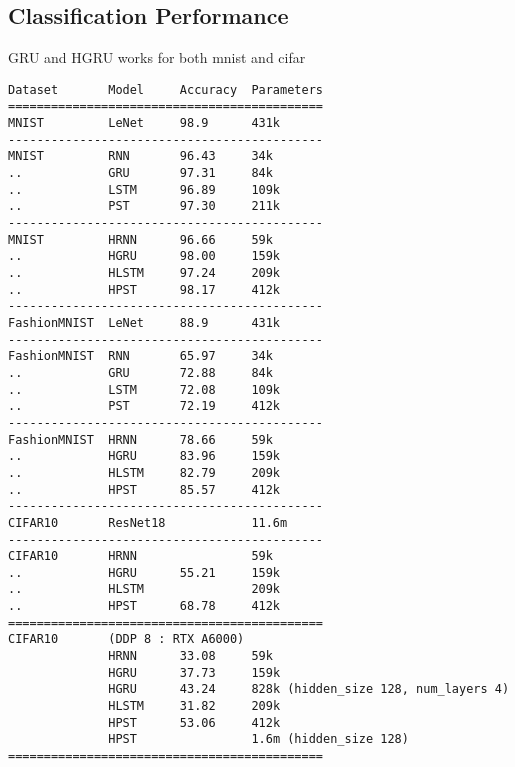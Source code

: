 \documentclass[10pt,twocolumn,letterpaper]{article}
\begin{document}
\subsection{Classification Performance}

GRU and HGRU works for both mnist and cifar

\begin{verbatim}
Dataset       Model     Accuracy  Parameters
============================================
MNIST         LeNet     98.9      431k
--------------------------------------------
MNIST         RNN       96.43     34k
..            GRU       97.31     84k
..            LSTM      96.89     109k
..            PST       97.30     211k
--------------------------------------------
MNIST         HRNN      96.66     59k
..            HGRU      98.00     159k
..            HLSTM     97.24     209k
..            HPST      98.17     412k
--------------------------------------------
FashionMNIST  LeNet     88.9      431k
--------------------------------------------
FashionMNIST  RNN       65.97     34k
..            GRU       72.88     84k
..            LSTM      72.08     109k
..            PST       72.19     412k
--------------------------------------------
FashionMNIST  HRNN      78.66     59k
..            HGRU      83.96     159k
..            HLSTM     82.79     209k
..            HPST      85.57     412k
--------------------------------------------
CIFAR10       ResNet18            11.6m
--------------------------------------------
CIFAR10       HRNN                59k
..            HGRU      55.21     159k
..            HLSTM               209k
..            HPST      68.78     412k
============================================
CIFAR10       (DDP 8 : RTX A6000)
              HRNN      33.08     59k
              HGRU      37.73     159k
              HGRU      43.24     828k (hidden_size 128, num_layers 4)
              HLSTM     31.82     209k
              HPST      53.06     412k
              HPST                1.6m (hidden_size 128)
============================================
\end{verbatim}


{\small


}
\end{document}

